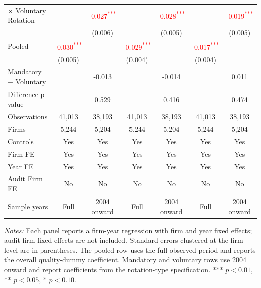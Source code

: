 \documentclass[10pt]{article}
\newcommand{\sym}[1]{\textsuperscript{#1}}
\begin{document}
\begin{minipage}{19cm}
\begin{threeparttable}
\begin{tabular}{l cc cc cc}
$\times$ Voluntary Rotation &  & \textcolor{red}{-0.027\sym{***}} &  & \textcolor{red}{-0.028\sym{***}} &  & \textcolor{red}{-0.019\sym{***}} \\
 &  & (0.006) &  & (0.005) &  & (0.005) \\
Pooled & \textcolor{red}{-0.030\sym{***}} &  & \textcolor{red}{-0.029\sym{***}} &  & \textcolor{red}{-0.017\sym{***}} &  \\
 & (0.005) &  & (0.004) &  & (0.004) &  \\
Mandatory $-$ Voluntary &  & -0.013 &  & -0.014 &  & 0.011 \\
Difference p-value &  & 0.529 &  & 0.416 &  & 0.474 \\
Observations & 41,013 & 38,193 & 41,013 & 38,193 & 41,013 & 38,193 \\
Firms & 5,244 & 5,204 & 5,244 & 5,204 & 5,244 & 5,204 \\
\midrule
Controls & Yes & Yes & Yes & Yes & Yes & Yes \\
Firm FE & Yes & Yes & Yes & Yes & Yes & Yes \\
Year FE & Yes & Yes & Yes & Yes & Yes & Yes \\
Audit Firm FE & No & No & No & No & No & No \\
Sample years & Full & 2004 onward & Full & 2004 onward & Full & 2004 onward \\
\bottomrule
\end{tabular}
\begin{tablenotes}\fontsize{9}{11}\selectfont
\item \fontsize{9}{11}\selectfont \textit{Notes:} Each panel reports a firm-year regression with firm and year fixed effects; audit-firm fixed effects are not included. Standard errors clustered at the firm level are in parentheses. The pooled row uses the full observed period and reports the overall quality-dummy coefficient. Mandatory and voluntary rows use 2004 onward and report coefficients from the rotation-type specification. *** \(p<0.01\), ** \(p<0.05\), * \(p<0.10\).
\end{tablenotes}
\end{threeparttable}

\end{minipage}
\end{document}
